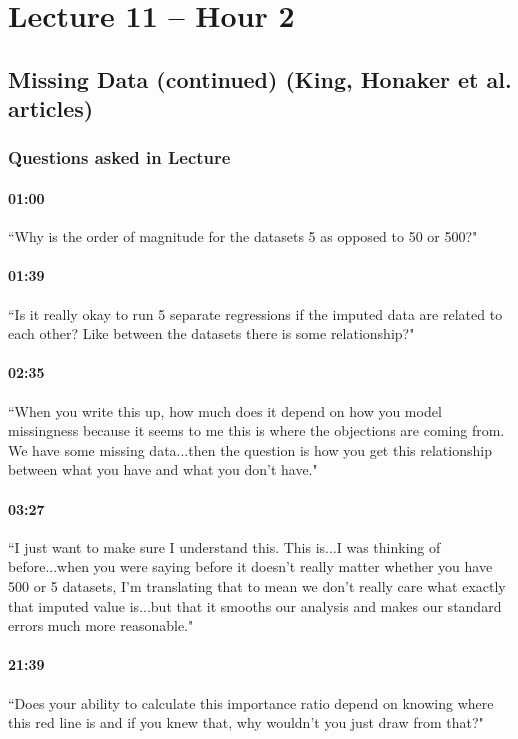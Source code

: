 \documentclass[11pt]{article}
\begin{document}
\section{Lecture 11 -- Hour 2}
\subsection{Missing Data (continued) (King, Honaker et al. articles)}

\subsubsection{Questions asked in Lecture}
\paragraph{01:00} ``Why is the order of magnitude for the datasets 5 as opposed to 50 or 500?"

\paragraph{01:39} ``Is it really okay to run 5 separate regressions if the imputed data are related to each other? Like between the datasets there is some relationship?"

\paragraph{02:35} ``When you write this up, how much does it depend on how you model missingness because it seems to me this is where the objections are coming from. We have some missing data...then the question is how you get this relationship between what you have and what you don't have."

\paragraph{03:27} ``I just want to make sure I understand this. This is...I was thinking of before...when you were saying before it doesn't really matter whether you have 500 or 5 datasets, I'm translating that to mean we don't really care what exactly that imputed value is...but that it smooths our analysis and makes our standard errors much more reasonable."

\paragraph{21:39} ``Does your ability to calculate this importance ratio depend on knowing where this red line is and if you knew that, why wouldn't you just draw from that?"
\end{document}
